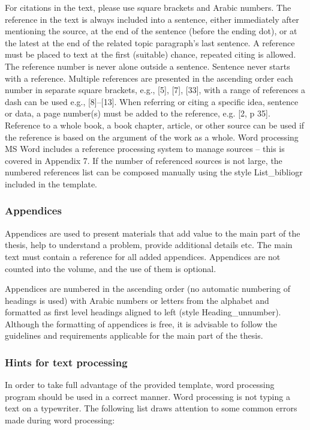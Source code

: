 For citations in the text, please use square brackets and Arabic numbers. The reference in
the text is always included into a sentence, either immediately after mentioning the source, at the end of the sentence (before the ending dot), or at the latest at the end of the
related topic paragraph’s last sentence. A reference must be placed to text at the first (suitable) chance, repeated citing is allowed. The reference number is never alone outside a sentence. Sentence never starts with a reference. Multiple references are presented in the ascending order each number in separate square brackets, e.g., [5], [7], [33], with a range of references a dash can be used e.g., [8]–[13]. When referring or citing a specific idea, sentence or data, a page number(s) must be added to the reference, e.g. [2, p 35]. Reference to a whole book, a book chapter, article, or other source can be used if the reference is based on the argument of the work as a whole.
Word processing MS Word includes a reference processing system to manage sources -- this is covered in Appendix 7.
If the number of referenced sources is not large, the numbered references list can be composed manually using the style List\_bibliogr included in the template.

\subsubsection{Appendices}
Appendices are used to present materials that add value to the main part of the thesis, help to understand a problem, provide additional details etc. The main text must contain a
reference for all added appendices. Appendices are not counted into the volume, and the use of them is optional.

Appendices are numbered in the ascending order (no automatic numbering of headings is used) with Arabic numbers or letters from the alphabet and formatted as first level
headings aligned to left (style Heading\_unnumber). Although the formatting of appendices is free, it is advisable to follow the guidelines and requirements applicable for
the main part of the thesis.

\subsubsection{Hints for text processing}

In order to take full advantage of the provided template, word processing program should be used in a correct manner. Word processing is not typing a text on a typewriter. The following list draws attention to some common errors made during word processing:

